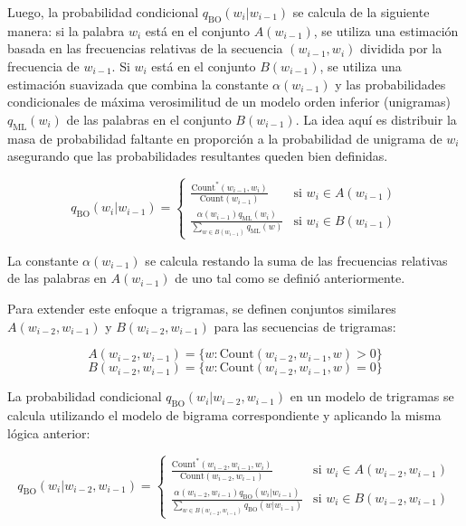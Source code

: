 Luego, la probabilidad condicional $q_{\text{BO}}(w_i | w_{i-1})$ se calcula de la siguiente manera: si la palabra $w_i$ está en el conjunto $A(w_{i-1})$, se utiliza una estimación basada en las frecuencias relativas de la secuencia $(w_{i-1}, w_i)$ dividida por la frecuencia de $w_{i-1}$. Si $w_i$ está en el conjunto $B(w_{i-1})$, se utiliza una estimación suavizada que combina la constante $\alpha(w_{i-1})$ y las probabilidades condicionales de máxima verosimilitud  de un modelo orden inferior (unigramas) $q_{\text{ML}}(w_i)$ de las palabras en el conjunto $B(w_{i-1})$. La idea aquí es distribuir la masa de probabilidad faltante en proporción a la probabilidad de unigrama de $w_i $   asegurando que las probabilidades resultantes queden bien definidas.

\[
q_{\text{BO}}(w_i | w_{i-1}) =
\begin{cases}
    \frac{\text{Count}^*(w_{i-1}, w_i)}{\text{Count}(w_{i-1})} & \text{si } w_i \in A(w_{i-1}) \\
    \frac{\alpha(w_{i-1}) q_{\text{ML}}(w_i)}{\sum_{w \in B(w_{i-1})} q_{\text{ML}}(w)} & \text{si } w_i \in B(w_{i-1})
\end{cases}
\]

La constante $\alpha(w_{i-1})$ se calcula restando la suma de las frecuencias relativas de las palabras en $A(w_{i-1})$ de uno tal como se definió anteriormente.



Para extender este enfoque a trigramas, se definen conjuntos similares $A(w_{i-2}, w_{i-1})$ y $B(w_{i-2}, w_{i-1})$ para las secuencias de trigramas:

\begin{definition}
\[
A(w_{i-2}, w_{i-1}) = \{w : \text{Count}(w_{i-2}, w_{i-1}, w) > 0\}
\]
\[
B(w_{i-2}, w_{i-1}) = \{w : \text{Count}(w_{i-2}, w_{i-1}, w) = 0\}
\] 
\end{definition}



La probabilidad condicional $q_{\text{BO}}(w_i | w_{i-2}, w_{i-1})$ en un modelo de trigramas se calcula utilizando el modelo de bigrama correspondiente y aplicando la misma lógica anterior:

\[
q_{\text{BO}}(w_i | w_{i-2}, w_{i-1}) =
\begin{cases}
    \frac{\text{Count}^*(w_{i-2}, w_{i-1}, w_i)}{\text{Count}(w_{i-2}, w_{i-1})} & \text{si } w_i \in A(w_{i-2}, w_{i-1}) \\
    \frac{\alpha(w_{i-2}, w_{i-1}) q_{\text{BO}}(w_i|w_{i-1})}{\sum_{w \in B(w_{i-2}, w_{i-1})} q_{\text{BO}}(w|w_{i-1})} & \text{si } w_i \in B(w_{i-2}, w_{i-1})
\end{cases}
\]

